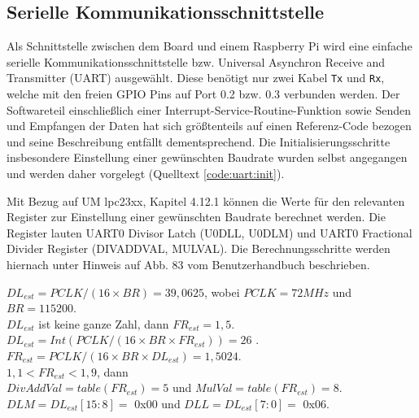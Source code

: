 \subsection{Serielle Kommunikationsschnittstelle}
Als Schnittstelle zwischen dem Board und einem Raspberry Pi wird eine einfache serielle Kommunikationsschnittstelle bzw. Universal Asynchron Receive and Transmitter (UART) ausgewählt. Diese benötigt nur zwei Kabel \texttt{Tx} und \texttt{Rx}, welche mit den freien GPIO Pins auf Port 0.2 bzw. 0.3 verbunden werden. Der Softwareteil einschließlich einer Interrupt-Service-Routine-Funktion sowie Senden und Empfangen der Daten hat sich größtenteils auf einen Referenz-Code bezogen und seine Beschreibung entfällt dementsprechend. Die Initialisierungsschritte insbesondere Einstellung einer gewünschten Baudrate wurden selbst angegangen und werden daher vorgelegt (Quelltext \ref{code:uart:init}).

Mit Bezug auf UM lpc23xx, Kapitel 4.12.1 können die Werte für den relevanten Register zur Einstellung einer gewünschten Baudrate berechnet werden. Die Register lauten UART0 Divisor Latch (U0DLL, U0DLM) und UART0 Fractional Divider Register (DIVADDVAL, MULVAL). Die Berechnungsschritte werden hiernach unter Hinweis auf Abb. 83 vom Benutzerhandbuch beschrieben.

\vspace{5mm}
$DL_{est} = PCLK/(16 \times BR) = 39,0625$, wobei $PCLK = 72 MHz$ und $BR = 115200$. \\
$DL_{est}$ ist keine ganze Zahl, dann $FR_{est} = 1,5$. 			      \\
$DL_{est} = Int ( PCLK/(16 \times BR \times FR_{est}) ) = 26$ .	    	      \\
$FR_{est} = PCLK/(16 \times BR \times DL_{est}) = 1,5024$. 		      \\
$1,1 < FR_{est} < 1,9$, dann 								      \\
$DivAddVal = table (FR_{est}) = 5$ und $MulVal = table (FR_{est}) = 8$. \\
$DLM = DL_{est}[15:8] =$ 0x00 und $DLL = DL_{est}[7:0] =$ 0x06.
\vspace{5mm}

